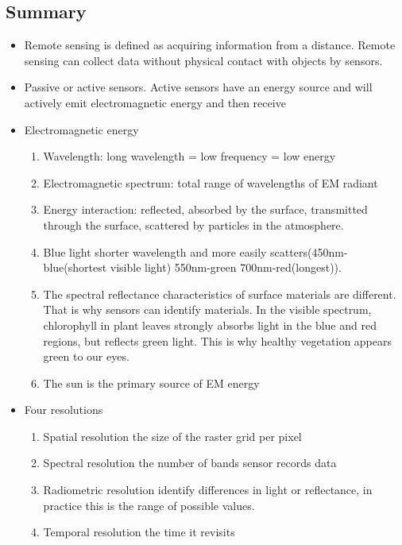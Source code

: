 \documentclass[
  letterpaper,
  DIV=11,
  numbers=noendperiod]{scrreprt}
\providecommand{\tightlist}{%
  \setlength{\itemsep}{0pt}\setlength{\parskip}{0pt}}\usepackage{longtable,booktabs,array}
\begin{document}
\hypertarget{summary}{%
\subsection{Summary}\label{summary}}

\begin{itemize}
\tightlist
\item
  Remote sensing is defined as acquiring information from a distance.
  Remote sensing can collect data without physical contact with objects
  by sensors.
\item
  Passive or active sensors. Active sensors have an energy source and
  will actively emit electromagnetic energy and then receive
\item
  Electromagnetic energy

  \begin{enumerate}
  \def\labelenumi{\arabic{enumi}.}
  \tightlist
  \item
    Wavelength: long wavelength = low frequency = low energy
  \item
    Electromagnetic spectrum: total range of wavelengths of EM radiant
  \item
    Energy interaction: reflected, absorbed by the surface, transmitted
    through the surface, scattered by particles in the atmosphere.
  \item
    Blue light shorter wavelength and more easily
    scatters(450nm-blue(shortest visible light) 550nm-green
    700nm-red(longest)).
  \item
    The spectral reflectance characteristics of surface materials are
    different. That is why sensors can identify materials. In the
    visible spectrum, chlorophyll in plant leaves strongly absorbs light
    in the blue and red regions, but reflects green light. This is why
    healthy vegetation appears green to our eyes.
  \item
    The sun is the primary source of EM energy
  \end{enumerate}
\item
  Four resolutions

  \begin{enumerate}
  \def\labelenumi{\arabic{enumi}.}
  \tightlist
  \item
    Spatial resolution the size of the raster grid per pixel
  \item
    Spectral resolution the number of bands sensor records data
  \item
    Radiometric resolution identify differences in light or reflectance,
    in practice this is the range of possible values.
  \item
    Temporal resolution the time it revisits
  \end{enumerate}
\end{itemize}
\end{document}
